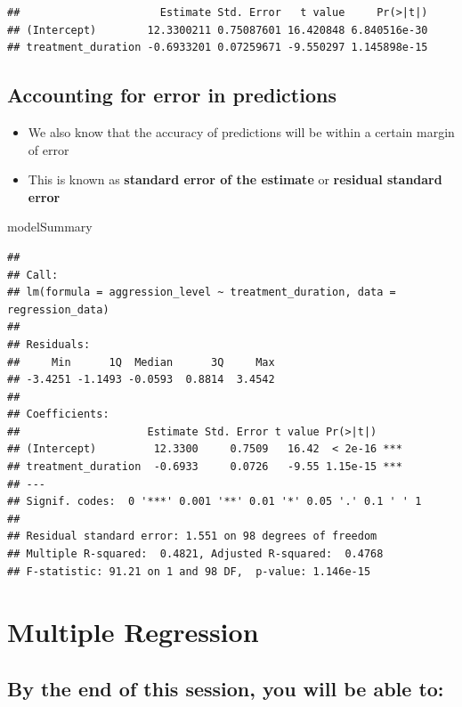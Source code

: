 \documentclass[
]{book}
\newenvironment{Shaded}{\begin{snugshade}}{\end{snugshade}}
\newcommand{\NormalTok}[1]{#1}
\providecommand{\tightlist}{%
  \setlength{\itemsep}{0pt}\setlength{\parskip}{0pt}}
\begin{document}
\begin{verbatim}
##                      Estimate Std. Error   t value     Pr(>|t|)
## (Intercept)        12.3300211 0.75087601 16.420848 6.840516e-30
## treatment_duration -0.6933201 0.07259671 -9.550297 1.145898e-15
\end{verbatim}

\hypertarget{accounting-for-error-in-predictions}{%
\section{Accounting for error in predictions}\label{accounting-for-error-in-predictions}}

\begin{itemize}
\tightlist
\item
  We also know that the accuracy of predictions will be within a certain margin of error
\item
  This is known as \textbf{standard error of the estimate} or \textbf{residual standard error}
\end{itemize}

\begin{Shaded}
\begin{Highlighting}[]
\NormalTok{modelSummary}
\end{Highlighting}
\end{Shaded}

\begin{verbatim}
## 
## Call:
## lm(formula = aggression_level ~ treatment_duration, data = regression_data)
## 
## Residuals:
##     Min      1Q  Median      3Q     Max 
## -3.4251 -1.1493 -0.0593  0.8814  3.4542 
## 
## Coefficients:
##                    Estimate Std. Error t value Pr(>|t|)    
## (Intercept)         12.3300     0.7509   16.42  < 2e-16 ***
## treatment_duration  -0.6933     0.0726   -9.55 1.15e-15 ***
## ---
## Signif. codes:  0 '***' 0.001 '**' 0.01 '*' 0.05 '.' 0.1 ' ' 1
## 
## Residual standard error: 1.551 on 98 degrees of freedom
## Multiple R-squared:  0.4821, Adjusted R-squared:  0.4768 
## F-statistic: 91.21 on 1 and 98 DF,  p-value: 1.146e-15
\end{verbatim}

\hypertarget{multiple-regression}{%
\chapter{Multiple Regression}\label{multiple-regression}}

\hypertarget{by-the-end-of-this-session-you-will-be-able-to}{%
\section{By the end of this session, you will be able to:}\label{by-the-end-of-this-session-you-will-be-able-to}}
\end{document}
